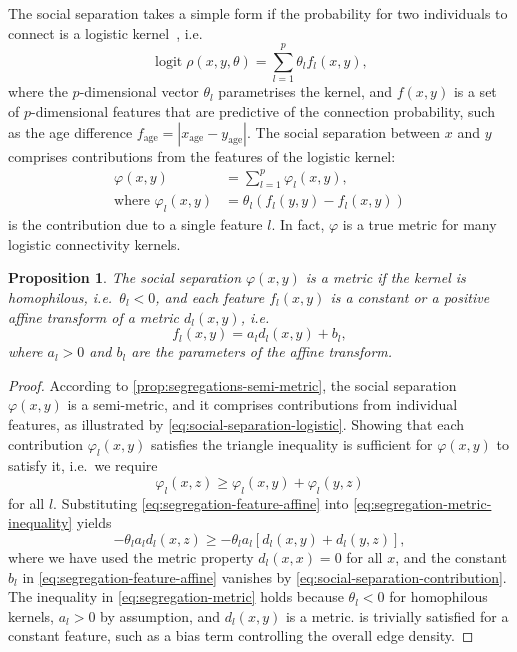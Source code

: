 \documentclass{scrartcl}
\DeclareMathOperator{\logit}{logit}
\newcommand{\abs}[1]{\left|#1\right|}
\newtheorem{prop}{Proposition}
\begin{document}
The social separation takes a simple form if the probability for two individuals to connect is a logistic kernel~\cite{Hoff2002}, i.e.\
\begin{equation}
    \logit\rho(x, y, \theta) = \sum_{l=1}^p\theta_l f_l(x,y),\label{eq:logistic-kernel}
\end{equation}
where the $p$-dimensional vector $\theta_l$ parametrises the kernel, and $f(x, y)$ is a set of $p$-dimensional features that are predictive of the connection probability, such as the age difference $f_\text{age}=\abs{x_\mathrm{age}-y_\mathrm{age}}$. The social separation between $x$ and $y$ comprises contributions from the features of the logistic kernel:
\begin{align}
    \varphi(x,y) &= \sum_{l=1}^p\varphi_l(x, y),\label{eq:social-separation-logistic}\\
    \text{where }\varphi_l(x, y) &= \theta_l\left(f_l(y, y) - f_l(x, y)\right)\label{eq:social-separation-contribution}
\end{align}
is the contribution due to a single feature $l$. In fact, $\varphi$ is a true metric for many logistic connectivity kernels.

\begin{prop}
    The social separation $\varphi(x,y)$ is a metric if the kernel is homophilous, i.e.\ $\theta_l<0$, and each feature $f_l(x, y)$ is a constant or a positive affine transform of a metric $d_l(x, y)$, i.e.
    \begin{equation}
        f_l(x, y) = a_l d_l(x, y) + b_l,\label{eq:segregation-feature-affine}
    \end{equation}
    where $a_l > 0$ and $b_l$ are the parameters of the affine transform.
\end{prop}
\begin{proof}
    According to \cref{prop:segregations-semi-metric}, the social separation $\varphi(x,y)$ is a semi-metric, and it comprises contributions from individual features, as illustrated by \cref{eq:social-separation-logistic}. Showing that each contribution $\varphi_l(x, y)$ satisfies the triangle inequality is sufficient for $\varphi(x, y)$ to satisfy it, i.e.\ we require
    \begin{equation}
        \varphi_l(x, z) \geq \varphi_l(x, y) + \varphi_l(y, z)\label{eq:segregation-metric-inequality}
    \end{equation}
    for all $l$. Substituting \cref{eq:segregation-feature-affine} into \cref{eq:segregation-metric-inequality} yields
    \begin{equation}
        -\theta_l a_l d_l(x, z)\geq -\theta_l a_l\left[d_l(x, y) + d_l(y, z)\right],\label{eq:segregation-metric}
    \end{equation}
    where we have used the metric property $d_l(x, x) = 0$ for all $x$, and the constant $b_l$ in \cref{eq:segregation-feature-affine} vanishes by \cref{eq:social-separation-contribution}. The inequality in \cref{eq:segregation-metric} holds because $\theta_l<0$ for homophilous kernels, $a_l>0$ by assumption, and $d_l(x, y)$ is a metric.  is trivially satisfied for a constant feature, such as a bias term controlling the overall edge density.
\end{proof}
\end{document}
